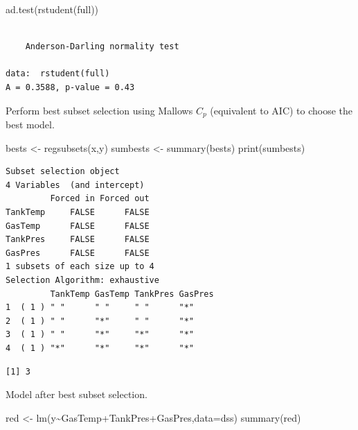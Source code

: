 \documentclass[
  letterpaper,
  DIV=11,
  numbers=noendperiod]{scrartcl}
\newenvironment{Shaded}{\begin{snugshade}}{\end{snugshade}}
\newcommand{\AttributeTok}[1]{\textcolor[rgb]{0.40,0.45,0.13}{#1}}
\newcommand{\FunctionTok}[1]{\textcolor[rgb]{0.28,0.35,0.67}{#1}}
\newcommand{\NormalTok}[1]{\textcolor[rgb]{0.00,0.23,0.31}{#1}}
\newcommand{\OtherTok}[1]{\textcolor[rgb]{0.00,0.23,0.31}{#1}}
\newcommand{\SpecialCharTok}[1]{\textcolor[rgb]{0.37,0.37,0.37}{#1}}
\begin{document}
\begin{Shaded}
\begin{Highlighting}[]
\FunctionTok{ad.test}\NormalTok{(}\FunctionTok{rstudent}\NormalTok{(full))}
\end{Highlighting}
\end{Shaded}

\begin{verbatim}

    Anderson-Darling normality test

data:  rstudent(full)
A = 0.3588, p-value = 0.43
\end{verbatim}

Perform best subset selection using Mallows \(C_p\) (equivalent to AIC)
to choose the best model.

\begin{Shaded}
\begin{Highlighting}[]
\NormalTok{bests }\OtherTok{\textless{}{-}} \FunctionTok{regsubsets}\NormalTok{(x,y)}
\NormalTok{sumbests }\OtherTok{\textless{}{-}} \FunctionTok{summary}\NormalTok{(bests)}
\FunctionTok{print}\NormalTok{(sumbests)}
\end{Highlighting}
\end{Shaded}

\begin{verbatim}
Subset selection object
4 Variables  (and intercept)
         Forced in Forced out
TankTemp     FALSE      FALSE
GasTemp      FALSE      FALSE
TankPres     FALSE      FALSE
GasPres      FALSE      FALSE
1 subsets of each size up to 4
Selection Algorithm: exhaustive
         TankTemp GasTemp TankPres GasPres
1  ( 1 ) " "      " "     " "      "*"    
2  ( 1 ) " "      "*"     " "      "*"    
3  ( 1 ) " "      "*"     "*"      "*"    
4  ( 1 ) "*"      "*"     "*"      "*"    
\end{verbatim}

\begin{Shaded}
\end{Shaded}

\begin{verbatim}
[1] 3
\end{verbatim}

Model after best subset selection.

\begin{Shaded}
\begin{Highlighting}[]
\NormalTok{red }\OtherTok{\textless{}{-}} \FunctionTok{lm}\NormalTok{(y}\SpecialCharTok{\textasciitilde{}}\NormalTok{GasTemp}\SpecialCharTok{+}\NormalTok{TankPres}\SpecialCharTok{+}\NormalTok{GasPres,}\AttributeTok{data=}\NormalTok{dss)}
\FunctionTok{summary}\NormalTok{(red)}
\end{Highlighting}
\end{Shaded}
\end{document}
